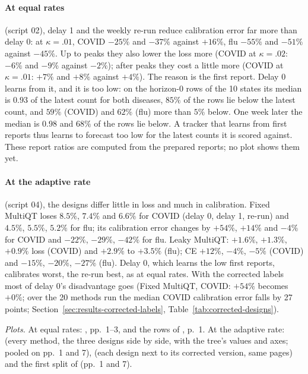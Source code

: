 \documentclass[11pt,a4paper]{article}
\theoremstyle{definition}
\theoremstyle{remark}
\begin{document}
\paragraph{At equal rates} (script 02), delay 1 and the weekly re-run
reduce calibration error far more than delay 0: at $\kappa=.01$, COVID
$-25\%$ and $-37\%$ against $+16\%$, flu $-55\%$ and $-51\%$ against
$-45\%$. Up to peaks they also lower the loss more (COVID at
$\kappa=.02$: $-6\%$ and $-9\%$ against $-2\%$); after peaks they cost a
little more (COVID at $\kappa=.01$: $+7\%$ and $+8\%$ against $+4\%$).
The reason is the first report. Delay 0 learns from it, and it is too
low: on the horizon-0 rows of the 10 states its median is $0.93$ of the
latest count for both diseases, $85\%$ of the rows lie below the latest
count, and $59\%$ (COVID) and $62\%$ (flu) more than $5\%$ below. One week
later the median is $0.98$ and $68\%$ of the rows lie below. A tracker
that learns from
first reports thus learns to forecast too low for the latest counts it
is scored against. These report ratios are computed from the prepared
reports; no plot shows them yet.

\paragraph{At the adaptive rate} (script 04), the designs differ little
in loss and much in calibration. Fixed MultiQT loses $8.5\%$, $7.4\%$ and
$6.6\%$ for COVID (delay 0, delay 1, re-run) and $4.5\%$, $5.5\%$, $5.2\%$
for flu; its calibration error changes by $+54\%$, $+14\%$ and $-4\%$ for
COVID and $-22\%$, $-29\%$, $-42\%$ for flu. Leaky MultiQT: $+1.6\%$,
$+1.3\%$, $+0.9\%$ loss (COVID) and $+2.9\%$ to $+3.5\%$ (flu); CE $+12\%$,
$-4\%$, $-5\%$ (COVID) and $-15\%$, $-20\%$, $-27\%$ (flu). Delay 0, which
learns the low first reports, calibrates worst, the re-run best, as at
equal rates. With the corrected labels most of delay 0's disadvantage goes
(Fixed MultiQT, COVID: $+54\%$ becomes $+0\%$; over the 20 methods run the
median COVID calibration error falls by 27 points;
Section~\ref{sec:results-corrected-labels}, Table~\ref{tab:corrected-designs}).

\emph{Plots.} At equal rates: ,
pp.~1--3, and the rows of , p.~1. At the
adaptive rate:  (every method, the three
designs side by side, with the tree's values and axes; pooled on pp.~1
and 7),  (each design next to its
corrected version, same pages) and the first split of
 (pp.~1 and 7).
\end{document}
